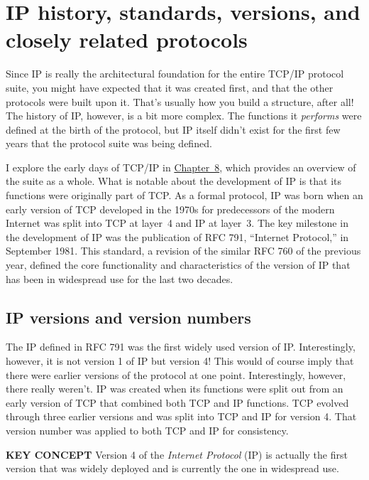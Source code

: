 \documentclass[b5paper,11pt]{memoir}
\begin{document}
\section{IP history, standards, versions, and closely related protocols}

Since IP is really the architectural foundation for the entire TCP/IP
protocol suite, you might have expected that it was created first, and
that the other protocols were built upon it. That's usually how you
build a structure, after all! The history of IP, however, is a bit more
complex. The functions it {\emph{performs}} were defined at the birth of
the protocol, but IP itself didn't exist for the first few years that
the protocol suite was being
defined.\protect\hypertarget{ch15s03.htmlux5cux23idx-CHP-15-0643}{}{}\protect\hypertarget{ch15s03.htmlux5cux23idx-CHP-15-0644}{}{}\protect\hypertarget{ch15s03.htmlux5cux23idx-CHP-15-0645}{}{}

I explore the early days of TCP/IP in \protect\hyperlink{ch08.html}{Chapter~8}, which provides an overview of the suite as a whole.
What is notable about the development of IP is that its functions were originally part of TCP.
As a formal protocol, IP was born when an early version of TCP developed in the 1970s for predecessors of the modern Internet was split into TCP at layer~4 and IP at layer~3.
The key milestone in the development of IP was the publication of RFC 791, ``Internet Protocol,'' in September 1981.
This standard, a revision of the similar RFC 760 of the previous year, defined the core functionality and characteristics of the version of IP that has been in widespread use for the last two decades.



\subsection{IP versions and version numbers}

The IP defined in RFC 791 was the first widely used version of IP.
Interestingly, however, it is not version 1 of IP but version 4! This would of course imply that there were earlier versions of the protocol at one point.
Interestingly, however, there really weren't.
IP was created when its functions were split out from an early version of TCP that combined both TCP and IP functions.
TCP evolved through three earlier versions and was split into TCP and IP for version 4.
That version number was applied to both TCP and IP for consistency.


{\textbf{KEY CONCEPT}} Version 4 of the {\emph{Internet Protocol}} (IP)
is actually the first version that was widely deployed and is currently
the one in widespread use.
\end{document}
